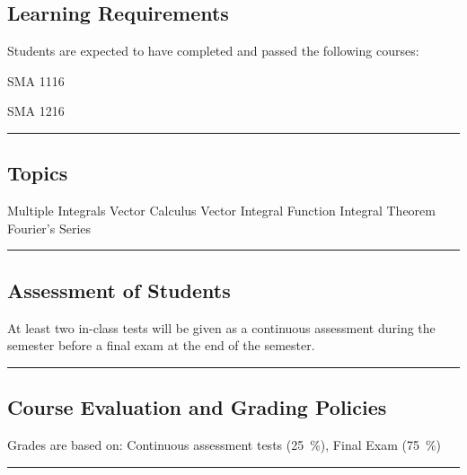 \subsection*{Learning Requirements}
Students are expected to have completed and passed the following courses:
\begin{outline}
    \1      SMA 1116

    \1      SMA 1216

\end{outline}
\vspace{2ex}\hrule\vspace{2ex}

\subsection*{Topics}
\begin{outline}
    \1 Multiple Integrals
    \1 Vector Calculus
    \1 Vector Integral Function
    \1 Integral Theorem
    \1 Fourier’s Series
\end{outline}
\vspace{2ex} \hrule\vspace{2ex}

\subsection*{Assessment of Students}
At least two in-class tests will be given as a continuous assessment during the semester before a final exam at the end of the semester.
\vspace{2ex}\hrule\vspace{2ex}

\subsection*{Course Evaluation and Grading Policies}
Grades are based on:
Continuous assessment tests (\qty{25}{\percent}),
Final Exam (\qty{75}{\percent})
\vspace{2ex}\hrule\vspace{2ex}

